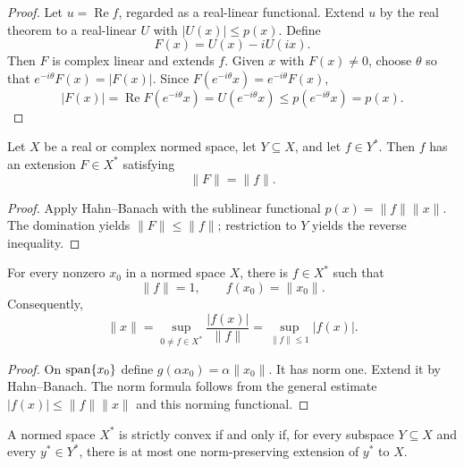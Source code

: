 \begin{proof}
Let $u=\operatorname{Re}f$, regarded as a real-linear functional.  Extend
$u$ by the real theorem to a real-linear $U$ with $|U(x)|\le p(x)$.  Define
\[
  F(x)=U(x)-iU(ix).
\]
Then $F$ is complex linear and extends $f$.  Given $x$ with $F(x)\ne0$,
choose $\theta$ so that $e^{-i\theta}F(x)=|F(x)|$.  Since
$F(e^{-i\theta}x)=e^{-i\theta}F(x)$,
\[
  |F(x)|=\operatorname{Re}F(e^{-i\theta}x)=U(e^{-i\theta}x)
  \le p(e^{-i\theta}x)=p(x).
\]
\end{proof}

\begin{notecorollary}
Let $X$ be a real or complex normed space, let $Y\subseteq X$, and let
$f\in Y^*$.  Then $f$ has an extension $F\in X^*$ satisfying
\[
  \|F\|=\|f\|.
\]
\end{notecorollary}

\begin{proof}
Apply Hahn--Banach with the sublinear functional
$p(x)=\|f\|\|x\|$.  The domination yields $\|F\|\le\|f\|$; restriction to
$Y$ yields the reverse inequality.
\end{proof}

\begin{notetheorem}
For every nonzero $x_0$ in a normed space $X$, there is $f\in X^*$ such that
\[
  \|f\|=1,
  \qquad
  f(x_0)=\|x_0\|.
\]
Consequently,
\[
  \|x\|=\sup_{0\ne f\in X^*}\frac{|f(x)|}{\|f\|}
       =\sup_{\|f\|\le1}|f(x)|.
\]
\end{notetheorem}

\begin{proof}
On $\operatorname{span}\{x_0\}$ define
$g(\alpha x_0)=\alpha\|x_0\|$.  It has norm one.  Extend it by
Hahn--Banach.  The norm formula follows from the general estimate
$|f(x)|\le\|f\|\|x\|$ and this norming functional.
\end{proof}

\begin{notetheorem}
A normed space $X^*$ is strictly convex if and only if, for every subspace
$Y\subseteq X$ and every $y^*\in Y^*$, there is at most one norm-preserving
extension of $y^*$ to $X$.
\end{notetheorem}

